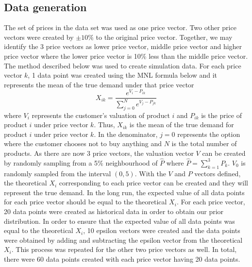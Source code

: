 \documentclass[a4paper]{article}
\begin{document}
\subsection{Data generation}
The set of prices in the data set was used as one price vector. Two other price vectors were created by $\pm 10\%$ to the original price vector. Together, we may identify the 3 price vectors as lower price vector, middle price vector and higher price vector where the lower price vector is 10\% less than the middle price vector. The method described below was used to create simulation data.
\newline
\newline
For each price vector $k$, 1 data point was created using the MNL formula below and it represents the mean of the true demand under that price vector
\[X_{ik} = \frac{e^{V_i - P_{ik}}}{\sum_{j=0}^{N}e^{V_j - P_{jk}}} \tag{1}\]
where $V_i$ represents the customer's valuation of product $i$ and $P_{ik}$ is the price of product $i$ under price vector $k$. Thus, $X_{ik}$ is the mean of the true demand for product $i$ under price vector $k$. In the denominator, $j=0$ represents the option where the customer chooses not to buy anything and $N$ is the total number of products.
\newline
\newline
As there are now 3 price vectors, the valuation vector $V$ can be created by randomly sampling from a 5\% neighbourhood of $\hat{P}$ where $\hat{P}=\sum_{k=1}^{3}P_k$. $V_0$ is randomly sampled from the interval $(0,5).$
\newline
\newline
With the $V$ and $P$ vectors defined, the theoretical $X_i$ corresponding to each price vector can be created and they will represent the true demand. In the long run, the expected value of all data points for each price vector should be equal to the theoretical $X_i$.
\newline
\newline
For each price vector, 20 data points were created as historical data in order to obtain our prior distribution. In order to ensure that the expected value of all data points was equal to the theoretical $X_i$, 10 epsilon vectors were created and the data points were obtained by adding and subtracting the epsilon vector from the theoretical $X_i$. This process was repeated for the other two price vectors as well. In total, there were 60 data points created with each price vector having 20 data points.
\end{document}
